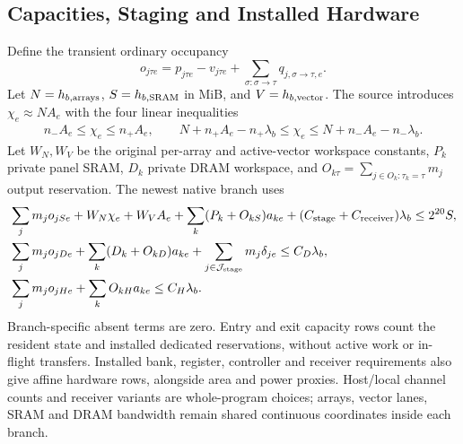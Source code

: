 \subsection{Capacities, Staging and Installed Hardware}\label{app:rows_capacity}
Define the transient ordinary occupancy
\[ o_{j\tau e}=p_{j\tau e}-v_{j\tau e} +\sum_{\sigma:\sigma\to\tau}q_{j,\sigma\to\tau,e}. \]
Let $N=h_{b,\rm arrays}$, $S=h_{b,\rm SRAM}$ in MiB, and $V=h_{b,\rm vector}$.
The source introduces $\chi_e\approx N A_e$ with the four linear inequalities
\begin{align}
 n_-A_e\le\chi_e\le n_+A_e,\qquad
 N+n_+A_e-n_+\lambda_b\le\chi_e
 \le N+n_-A_e-n_-\lambda_b .
 \label{eq:native_workspace}
\end{align}
Let $W_N,W_V$ be the original per-array and active-vector workspace constants, $P_k$ private panel SRAM, $D_k$ private DRAM workspace, and $O_{k\tau}=\sum_{j\in O_k:\tau_k=\tau}m_j$ output reservation.
The newest native branch uses
\begin{align}
 &\sum_jm_jo_{jSe}+W_N\chi_e+W_VA_e
        +\sum_k(P_k+O_{kS})a_{ke}
        +(C_{\rm stage}+C_{\rm receiver})\lambda_b
       \le 2^{20}S,\nonumber\\
 &\sum_jm_jo_{jDe}+\sum_k(D_k+O_{kD})a_{ke}
        +\sum_{j\in\mathcal J_{\rm stage}}m_j\delta_{je}
       \le C_D\lambda_b,\nonumber\\
 &\sum_jm_jo_{jHe}+\sum_k O_{kH}a_{ke}\le C_H\lambda_b .
 \label{eq:native_capacity}
\end{align}
Branch-specific absent terms are zero.
Entry and exit capacity rows count the resident state and installed dedicated reservations, without active work or in-flight transfers.
Installed bank, register, controller and receiver requirements also give affine hardware rows, alongside area and power proxies.
Host/local channel counts and receiver variants are whole-program choices; arrays, vector lanes, SRAM and DRAM bandwidth remain shared continuous coordinates inside each branch.


